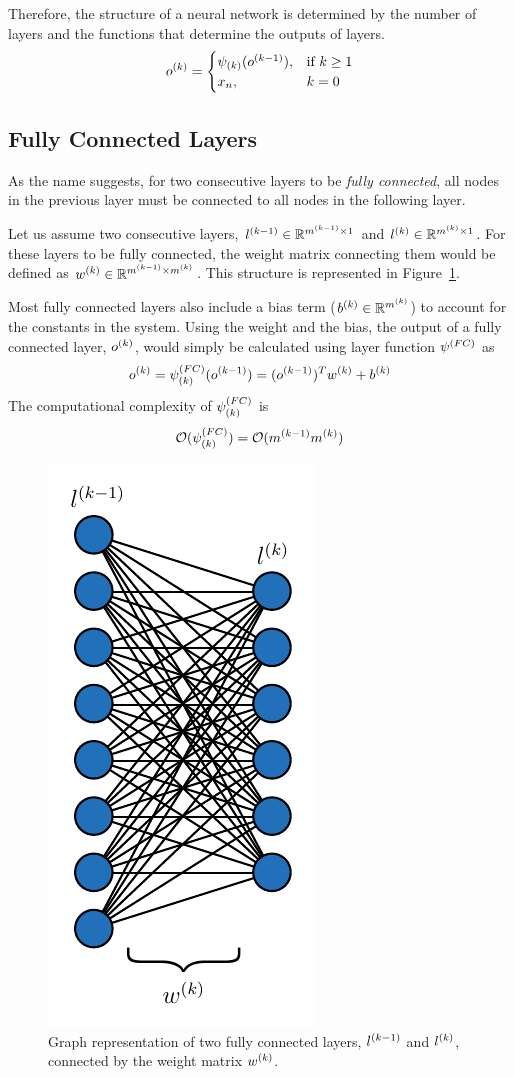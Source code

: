Therefore, the structure of a neural network is determined by the number of layers and the functions that determine the outputs of layers.
\begin{equation}
\label{eq:output_of_layers}
    o^{(k)} = 
\begin{cases}
    \psi_{(k)}(o^{(k-1)}), &\text{if } k\geq 1\\
    x_{n},& k = 0\\
\end{cases}
\end{equation}


\subsection{Fully Connected Layers}
As the name suggests, for two consecutive layers to be \textit{fully connected}, all nodes in the previous layer must be connected to all nodes in the following layer. 

Let us assume two consecutive layers, $l^{(k-1)} \in \mathbb{R}^{m^{(k-1)} \times 1}$ and $l^{(k)} \in \mathbb{R}^{m^{(k)} \times 1}$. For these layers to be fully connected, the weight matrix connecting them would be defined as $w^{(k)} \in \mathbb{R}^{m^{(k-1)} \times m^{(k)}}$. This structure is represented in Figure~\ref{fig:fully_connected}.

Most fully connected layers also include a bias term ($b^{(k)} \in  \mathbb{R}^{m^{(k)}}$) to account for the constants in the system. Using the weight and the bias, the output of a fully connected layer, $o^{(k)}$, would simply be calculated using layer function $\psi^{(FC)}$ as
$$ o^{(k)} = \psi^{(FC)}_{(k)}(o^{(k-1)}) = (o^{(k-1)})^T w^{(k)} + b^{(k)}$$
The computational complexity of $\psi^{(FC)}_{(k)}$ is
$$\mathcal{O}(\psi^{(FC)}_{(k)}) = \mathcal{O}(m^{(k-1)}m^{(k)})$$

\begin{figure}[!h]
  \begin{centering}
    \includegraphics[width=.3\textwidth]{images/fully_connected.pdf}
    \caption{Graph representation of two fully connected layers, $l^{(k-1)}$ and $l^{(k)}$, connected by the weight matrix $w^{(k)}$.}
    \label{fig:fully_connected}
  \end{centering}
\end{figure}

